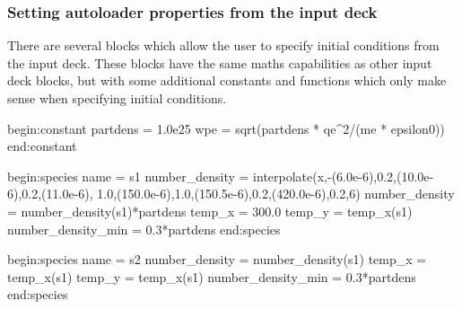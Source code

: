 \documentclass[12pt,a4paper]{article}
\newenvironment{nbboxverbatim}[1]{
\noindent\minipage{\textwidth}
\setlength{\FrameSep}{0pt}
\def\FrameCommand{\fboxsep=0pt \colorbox{shadecolor}}
\MakeFramed{\FrameRestore}
\fvset{label=#1}
\boxverb
}{
\endboxverb
\vspace{-13.5pt}
\endMakeFramed
\endminipage
\vspace{5pt}
}
\begin{document}
\subsubsection{Setting autoloader properties from the input deck}
There are several blocks which allow the user to specify initial conditions
from the input deck. These blocks have the same maths capabilities as other
input deck blocks, but with some additional constants and functions which
only make sense when specifying initial conditions.\\

\begin{nbboxverbatim}{none}
begin:constant
   partdens = 1.0e25
   wpe = sqrt(partdens * qe^2/(me * epsilon0))
end:constant

begin:species
   name = s1
   number_density = interpolate(x,-(6.0e-6),0.2,(10.0e-6),0.2,(11.0e-6),
            1.0,(150.0e-6),1.0,(150.5e-6),0.2,(420.0e-6),0.2,6)
   number_density = number_density(s1)*partdens
   temp_x = 300.0
   temp_y = temp_x(s1)
   number_density_min = 0.3*partdens
end:species

begin:species
   name = s2
   number_density = number_density(s1)
   temp_x = temp_x(s1)
   temp_y = temp_x(s1)
   number_density_min = 0.3*partdens
end:species
\end{nbboxverbatim}
\end{document}
